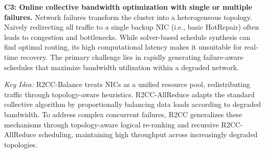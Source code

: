 \smallskip\noindent\textbf{C3: Online collective bandwidth optimization with single or multiple failures.} Network failures transform the cluster into a heterogeneous topology. Naively redirecting all traffic to a single backup NIC (i.e., basic HotRepair) often leads to congestion and bottlenecks. While solver-based schedule synthesis can find optimal routing, its high computational latency makes it unsuitable for real-time recovery. The primary challenge lies in rapidly generating failure-aware schedules that maximize bandwidth utilization within a degraded network.

\textit{Key Idea:} R2CC-Balance treats NICs as a unified resource pool, redistributing traffic through topology-aware heuristics. R2CC-AllReduce adapts the standard collective algorithm by proportionally balancing data loads according to degraded bandwidth. To address complex concurrent failures, R2CC generalizes these mechanisms through topology-aware logical re-ranking and recursive R2CC-AllReduce scheduling, maintaining high throughput across increasingly degraded topologies.
